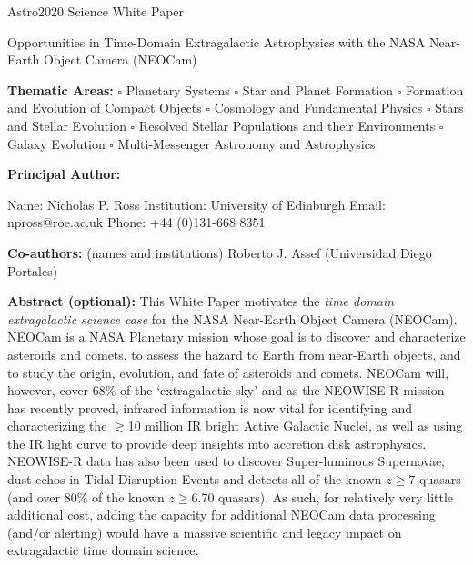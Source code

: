 \documentclass[12pt]{article}
\begin{document}
\raggedright
\huge
Astro2020 Science White Paper \linebreak

Opportunities in Time-Domain Extragalactic Astrophysics with the NASA
Near-Earth Object Camera (NEOCam)
\linebreak
\normalsize

\noindent \textbf{Thematic Areas:} 
\hspace*{60pt} $\square$ Planetary Systems 
\hspace*{10pt} $\square$ Star and Planet Formation 
\hspace*{20pt} 
\linebreak
$\square$ Formation and Evolution of Compact Objects 
\hspace*{31pt} $\square$ Cosmology and Fundamental Physics 
\linebreak
  $\square$  Stars and Stellar Evolution \hspace*{1pt} 
 $\square$ Resolved Stellar Populations and their Environments \hspace*{40pt} 
\linebreak
  $\square$    Galaxy Evolution   \hspace*{45pt} $\square$             
Multi-Messenger Astronomy and Astrophysics \hspace*{65pt} \linebreak
  
\textbf{Principal Author:}

Name: Nicholas P. Ross	
 \linebreak						
Institution:  University of Edinburgh
 \linebreak
Email: npross@roe.ac.uk
 \linebreak
Phone:  +44 (0)131-668 8351
 \linebreak
 
\textbf{Co-authors:} (names and institutions)
  \linebreak
Roberto J. Assef (Universidad Diego Portales)   \linebreak


\textbf{Abstract  (optional):}
This White Paper motivates the {\it time domain extragalactic science
case} for the NASA Near-Earth Object Camera (NEOCam). NEOCam is a NASA
Planetary mission whose goal is to discover and characterize asteroids
and comets, to assess the hazard to Earth from near-Earth objects, and
to study the origin, evolution, and fate of asteroids and
comets. NEOCam will, however, cover 68\% of the `extragalactic sky'
and as the NEOWISE-R mission has recently proved, infrared information
is now vital for identifying and characterizing the $\gtrsim$10
million IR bright Active Galactic Nuclei, as well as using the IR
light curve to provide deep insights into accretion disk
astrophysics. NEOWISE-R data has also been used to discover
Super-luminous Supernovae, dust echos in Tidal Disruption Events and
detects all of the known $z\geq7$ quasars (and over 80\% of the known 
$z\geq6.70$ quasars).
As such, for relatively very little additional cost, adding the capacity for additional NEOCam
data processing (and/or alerting) would have a massive scientific and
legacy impact on extragalactic time domain science.
\end{document}
